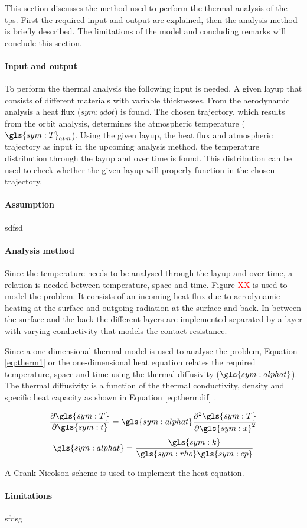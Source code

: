 This section discusses the method used to perform the thermal analysis of the \acrfull{tps}. First the required input and output are explained, then the analysis method is briefly described. The limitations of the model and concluding remarks will conclude this section.

\paragraph{Input and output}
To perform the thermal analysis the following input is needed. A given layup that consists of different materials with variable thicknesses. From the aerodynamic analysis a heat flux (${sym:qdot}$) is found. The chosen trajectory, which results from the orbit analysis, determines the atmospheric temperature ($\gls{sym:T}_{atm}$). Using the given layup, the heat flux and atmospheric trajectory as input in the upcoming analysis method, the temperature distribution through the layup and over time is found. This distribution can be used to check whether the given layup will properly function in the chosen trajectory.

\paragraph{Assumption}
sdfsd

\paragraph{Analysis method}
Since the temperature needs to be analysed through the layup and over time, a relation is needed between temperature, space and time. Figure \textcolor{red}{XX} is used to model the problem. It consists of an incoming heat flux due to aerodynamic heating at the surface and outgoing radiation at the surface and back. In between the surface and the back the different layers are implemented separated by a layer with varying conductivity that models the contact resistance.


Since a one-dimensional thermal model is used to analyse the problem, Equation \ref{eq:therm1} or the one-dimensional heat equation relates the required temperature, space and time using the thermal diffusivity ($\gls{sym:alphat}$). The thermal diffusivity is a function of the thermal conductivity, density and specific heat capacity as shown in Equation \ref{eq:thermdif} \cite{Holman2002}.

\begin{multicols}{2}
\begin{equation}
\frac{\partial \gls{sym:T}}{\partial \gls{sym:t}} = \gls{sym:alphat}\frac{\partial^2\gls{sym:T}}{\partial \gls{sym:x}^2}
\label{eq:heat}
\end{equation}\break
\begin{equation}
\gls{sym:alphat} = \frac{\gls{sym:k}}{\gls{sym:rho}\gls{sym:cp}}
\label{eq:thermdif}
\end{equation}
\end{multicols}

A Crank-Nicolson scheme is used to implement the heat equation. 

\paragraph{Limitations}
sfdsg



